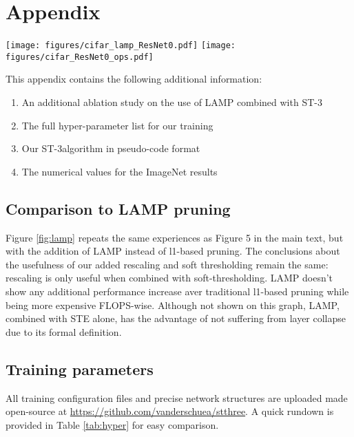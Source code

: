 \documentclass[10pt,twocolumn,letterpaper]{article}
\begin{document}
{\small


}
\appendix
\section*{Appendix}
\renewcommand{\thesubsection}{\Alph{subsection}}
\thispagestyle{empty}
\begin{figure*}[h!]
  \centering
   \texttt{[image: figures/cifar\_lamp\_ResNet0.pdf]}
   \texttt{[image: figures/cifar\_ResNet0\_ops.pdf]}
   \caption{(left) A study dissecting the impact of straight-through estimation, soft-thresholding and weight-rescaling during sparse training with LAMP-based sparse-weight-selection. (right) FLOPS/Sparsity trade-off comparing l1 and LAMP sparse training. A log-scale is used for the x-axes.}
   \label{fig:lamp}
\end{figure*}



This appendix contains the following additional information:
\begin{enumerate}
    \item An additional ablation study on the use of LAMP combined with ST-3
    \item The full hyper-parameter list for our training
    \item Our ST-3algorithm in pseudo-code format
    \item The numerical values for the ImageNet results
\end{enumerate}
\subsection{Comparison to LAMP pruning}

Figure \ref{fig:lamp} repeats the same experiences as Figure 5 in the main text, but with the addition of LAMP instead of l1-based pruning. The conclusions about the usefulness of our added rescaling and soft thresholding remain the same: rescaling is only useful when combined with soft-thresholding. LAMP doesn't show any additional performance increase aver traditional l1-based pruning while being more expensive FLOPS-wise. Although not shown on this graph, LAMP, combined with STE alone, has the advantage of not suffering from layer collapse due to its formal definition.
\subsection{Training parameters}
All training configuration files and precise network structures are uploaded made open-source at \url{https://github.com/vanderschuea/stthree}. A quick rundown is provided in Table \ref{tab:hyper} for easy comparison.
\end{document}
